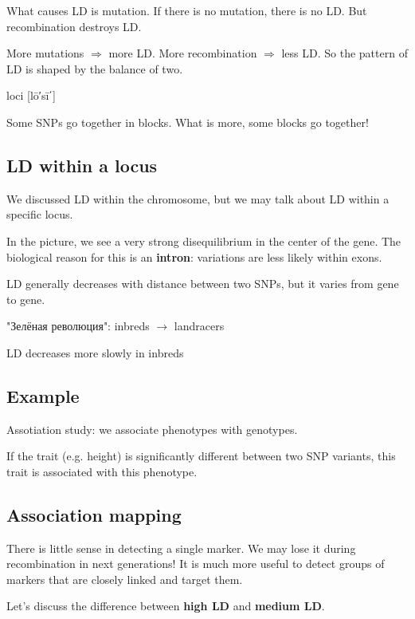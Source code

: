 \documentclass[main.tex]{subfiles}
\begin{document}
What causes LD is mutation.
If there is no mutation, there is no LD.
But recombination destroys LD.

More mutations $\Rightarrow$ more LD.
More recombination $ \Rightarrow $ less LD.
So the pattern of LD is shaped by the balance of two.

\begin{leftbar}
	loci  [lō′sī΄]
\end{leftbar}

Some SNPs go together in blocks.
What is more, some blocks go together!

\subsection{LD within a locus}

We discussed LD within the chromosome, but we may talk about LD within a specific locus.

In the picture, we see a very strong disequilibrium in the center of the gene.
The biological reason for this is an \textbf{intron}: variations are less likely within exons.

LD generally decreases with distance between two SNPs, but it varies from gene to gene.

\begin{leftbar}
 "Зелёная революция": inbreds $ \rightarrow $ landracers
\end{leftbar}

LD decreases more slowly in inbreds

\subsection{Example}

Assotiation study: we associate phenotypes with genotypes.

If the trait (e.g. height) is significantly different between two SNP variants, this trait is associated with this phenotype.

\subsection{Association mapping}

There is little sense in detecting a single marker.
We may lose it during recombination in next generations!
It is much more useful to detect groups of markers that are closely linked and target them.

Let's discuss the difference between \textbf{high LD} and \textbf{medium LD}.
\end{document}
